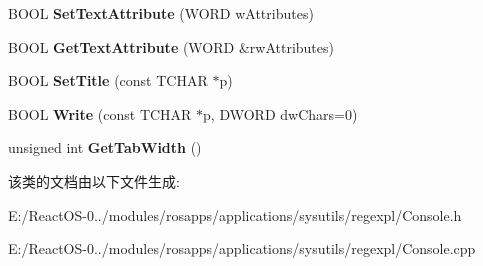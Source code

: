 \begin{DoxyCompactItemize}
B\+O\+OL {\bfseries Set\+Text\+Attribute} (W\+O\+RD w\+Attributes)
\item 
\mbox{\label{class_c_console_a890b12f20bb0602efbfea31f1506f2f6}} 
B\+O\+OL {\bfseries Get\+Text\+Attribute} (W\+O\+RD \&rw\+Attributes)
\item 
\mbox{\label{class_c_console_a33246b6e07666ebbaafa958dbd457aab}} 
B\+O\+OL {\bfseries Set\+Title} (const T\+C\+H\+AR $\ast$p)
\item 
\mbox{\label{class_c_console_add8c45bfbf88b963782540c61a18b667}} 
B\+O\+OL {\bfseries Write} (const T\+C\+H\+AR $\ast$p, D\+W\+O\+RD dw\+Chars=0)
\item 
\mbox{\label{class_c_console_a380631db41baf89724ac9b0240e54faf}} 
unsigned int {\bfseries Get\+Tab\+Width} ()
\end{DoxyCompactItemize}


该类的文档由以下文件生成\+:\begin{DoxyCompactItemize}
\item 
E\+:/\+React\+O\+S-\/0../modules/rosapps/applications/sysutils/regexpl/Console.\+h\item 
E\+:/\+React\+O\+S-\/0../modules/rosapps/applications/sysutils/regexpl/Console.\+cpp\end{DoxyCompactItemize}
